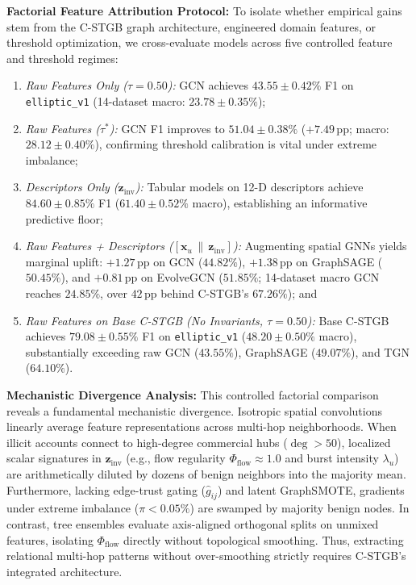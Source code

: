 \textbf{Factorial Feature Attribution Protocol:} To isolate whether empirical gains stem from the C-STGB graph architecture, engineered domain features, or threshold optimization, we cross-evaluate models across five controlled feature and threshold regimes:
\begin{enumerate}
    \item \textit{Raw Features Only ($\tau=0.50$):} GCN achieves $43.55 \pm 0.42\%$ F1 on \texttt{elliptic\_v1} (14-dataset macro: $23.78 \pm 0.35\%$);
    \item \textit{Raw Features ($\tau^*$):} GCN F1 improves to $51.04 \pm 0.38\%$ ($+7.49$\,pp; macro: $28.12 \pm 0.40\%$), confirming threshold calibration is vital under extreme imbalance;
    \item \textit{Descriptors Only ($\mathbf{z}_{\text{inv}}$):} Tabular models on 12-D descriptors achieve $84.60 \pm 0.85\%$ F1 ($61.40 \pm 0.52\%$ macro), establishing an informative predictive floor;
    \item \textit{Raw Features + Descriptors ($[\mathbf{x}_u \,\|\, \mathbf{z}_{\text{inv}}]$):} Augmenting spatial GNNs yields marginal uplift: $+1.27$\,pp on GCN ($44.82\%$), $+1.38$\,pp on GraphSAGE ($50.45\%$), and $+0.81$\,pp on EvolveGCN ($51.85\%$; 14-dataset macro GCN reaches $24.85\%$, over $42$\,pp behind C-STGB's $67.26\%$); and
    \item \textit{Raw Features on Base C-STGB (No Invariants, $\tau=0.50$):} Base C-STGB achieves $79.08 \pm 0.55\%$ F1 on \texttt{elliptic\_v1} ($48.20 \pm 0.50\%$ macro), substantially exceeding raw GCN ($43.55\%$), GraphSAGE ($49.07\%$), and TGN ($64.10\%$).
\end{enumerate}

\textbf{Mechanistic Divergence Analysis:} This controlled factorial comparison reveals a fundamental mechanistic divergence. Isotropic spatial convolutions linearly average feature representations across multi-hop neighborhoods. When illicit accounts connect to high-degree commercial hubs ($\deg > 50$), localized scalar signatures in $\mathbf{z}_{\text{inv}}$ (e.g., flow regularity $\Phi_{\text{flow}} \approx 1.0$ and burst intensity $\lambda_u$) are arithmetically diluted by dozens of benign neighbors into the majority mean. Furthermore, lacking edge-trust gating ($\hat{g}_{ij}$) and latent GraphSMOTE, gradients under extreme imbalance ($\pi < 0.05\%$) are swamped by majority benign nodes. In contrast, tree ensembles evaluate axis-aligned orthogonal splits on unmixed features, isolating $\Phi_{\text{flow}}$ directly without topological smoothing. Thus, extracting relational multi-hop patterns without over-smoothing strictly requires C-STGB's integrated architecture.

